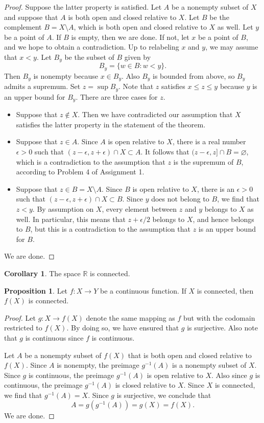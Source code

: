 \documentclass[12pt]{article}
\theoremstyle{definition}
\theoremstyle{theorem}
\newtheorem{proposition}[definition]{Proposition}
\newtheorem{corollary}[definition]{Corollary}
\begin{document}
\begin{proof}
Suppose the latter property is satisfied. Let $A$ be a nonempty subset of $X$ and suppose that $A$ is both open and closed relative to $X$. Let $B$ be the complement $B = X \setminus A$, which is both open and closed relative to $X$ as well. Let $y$ be a point of $A$. If $B$ is empty, then we are done. If not, let $x$ be a point of $B$, and we hope to obtain a contradiction.  Up to relabeling $x$ and $y$, we may assume that $x < y$. Let $B_y$ be the subset of $B$ given by 
\[
B_y = \{w \in B : w < y\}. 
\]
Then $B_y$ is nonempty because  $x \in B_y$. Also $B_y$ is bounded from above, so $B_y$ admits a supremum. Set $z = \sup B_y$. Note that $z$ satisfies $x \leqslant z \leqslant y$ because $y$ is an upper bound for $B_y$. There are three cases for $z$. 
\begin{itemize}
\item Suppose that $z \notin X$. Then we have contradicted our assumption that $X$ satisfies the latter property in the statement of the theorem. 
\item Suppose that $z \in A$. Since $A$ is open relative to $X$, there is a real number $\epsilon > 0$ such that $(z - \epsilon, z + \epsilon) \cap X \subset A$. It follows that $(z - \epsilon, z] \cap B = \varnothing$, which is a contradiction to the assumption that $z$ is the supremum of $B$, according to Problem 4 of Assignment 1. 
\item Suppose that $z \in B = X \setminus A$. Since $B$ is open relative to $X$, there is an $\epsilon > 0$ such that $(z-\epsilon, z+\epsilon) \cap X \subset B$. Since $y$ does not belong to $B$, we find that $z < y$. By assumption on $X$, every element between $z$ and $y$ belongs to $X$ as well. In particular, this means that $z + \epsilon/2$ belongs to $X$, and hence belongs to $B$, but this is a contradiction to the assumption that $z$ is an upper bound for $B$.   
\end{itemize}
We are done. 
\end{proof}

\begin{corollary}
The space $\mathbb{R}$ is connected. 
\end{corollary}


\begin{proposition}
Let $f : X \to Y$ be a continuous function. If $X$ is connected, then $f(X)$ is connected. 
\end{proposition}

\begin{proof}
Let $g : X \to f(X)$ denote the same mapping as $f$ but with the codomain restricted to $f(X)$. By doing so, we have ensured that $g$ is surjective. Also note that $g$ is continuous since $f$ is continuous. 

Let $A$ be a nonempty subset of $f(X)$ that is both open and closed relative to $f(X)$. Since $A$ is nonempty, the preimage $g^{-1}(A)$ is a nonempty subset of $X$. Since $g$ is continuous, the preimage $g^{-1}(A)$ is open relative to $X$. Also since $g$ is continuous, the preimage $g^{-1}(A)$ is closed relative to $X$. Since $X$ is connected, we find that $g^{-1}(A) = X$. Since $g$ is surjective, we conclude that 
\[
A = g(g^{-1}(A)) = g(X) = f(X).
\] We are done. 
\end{proof}
\end{document}
